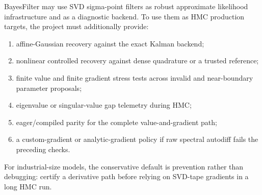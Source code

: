 BayesFilter may use SVD sigma-point filters as robust approximate likelihood
infrastructure and as a diagnostic backend.  To use them as HMC production
targets, the project must additionally provide:
\begin{enumerate}[label=(\roman*)]
  \item affine-Gaussian recovery against the exact Kalman backend;
  \item nonlinear controlled recovery against dense quadrature or a trusted
    reference;
  \item finite value and finite gradient stress tests across invalid and
    near-boundary parameter proposals;
  \item eigenvalue or singular-value gap telemetry during HMC;
  \item eager/compiled parity for the complete value-and-gradient path;
  \item a custom-gradient or analytic-gradient policy if raw spectral autodiff
    fails the preceding checks.
\end{enumerate}
For industrial-size models, the conservative default is prevention rather than
debugging: certify a derivative path before relying on SVD-tape gradients in a
long HMC run.
